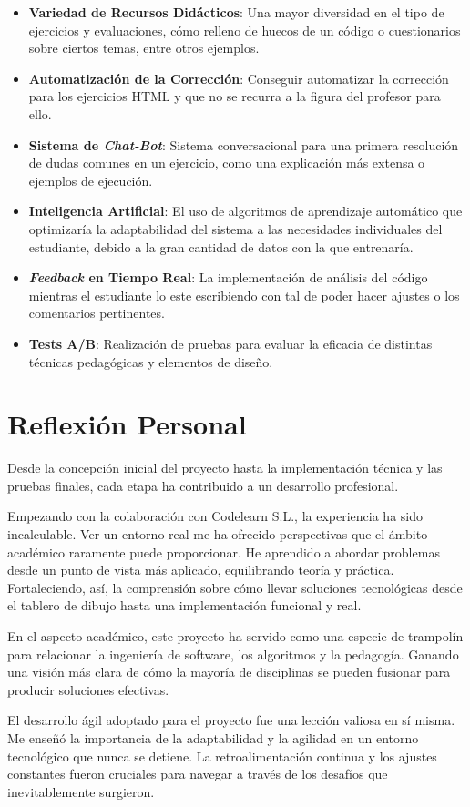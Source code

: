 \begin{itemize}
    \item \textbf{Variedad de Recursos Didácticos}: Una mayor diversidad en el tipo de ejercicios y evaluaciones, cómo relleno de huecos de un código o cuestionarios sobre ciertos temas, entre otros ejemplos.
    \item \textbf{Automatización  de la Corrección}: Conseguir automatizar la corrección para los ejercicios HTML y que no se recurra a la figura del profesor para ello. 
    \item \textbf{Sistema de \textit{Chat-Bot}}: Sistema conversacional para una primera resolución de dudas comunes en un ejercicio, como una explicación más extensa o ejemplos de ejecución.  
    \item \textbf{Inteligencia Artificial}: El uso de algoritmos de aprendizaje automático que optimizaría la adaptabilidad del sistema a las necesidades individuales del estudiante, debido a la gran cantidad de datos con la que entrenaría.
    \item \textbf{\textit{Feedback} en Tiempo Real}: La implementación de análisis del código mientras el estudiante lo este escribiendo con tal de poder hacer ajustes o los comentarios pertinentes.
    \item \textbf{Tests A/B}: Realización de pruebas para evaluar la eficacia de distintas técnicas pedagógicas y elementos de diseño.
  \end{itemize}

\section{Reflexión Personal}
Desde la concepción inicial del proyecto hasta la implementación técnica y las pruebas finales, cada etapa ha contribuido a un desarrollo profesional.

Empezando con la colaboración con Codelearn S.L., la experiencia ha sido incalculable. Ver un entorno real me ha ofrecido perspectivas que el ámbito académico raramente puede proporcionar. He aprendido a abordar problemas desde un punto de vista más aplicado, equilibrando teoría y práctica. Fortaleciendo, así, la comprensión sobre cómo llevar soluciones tecnológicas desde el tablero de dibujo hasta una implementación funcional y real.

En el aspecto académico, este proyecto ha servido como una especie de trampolín para relacionar la ingeniería de software, los algoritmos y la pedagogía. Ganando una visión más clara de cómo la mayoría de disciplinas se pueden fusionar para producir soluciones efectivas. 

El desarrollo ágil adoptado para el proyecto fue una lección valiosa en sí misma. Me enseñó la importancia de la adaptabilidad y la agilidad en un entorno tecnológico que nunca se detiene. La retroalimentación continua y los ajustes constantes fueron cruciales para navegar a través de los desafíos que inevitablemente surgieron.

